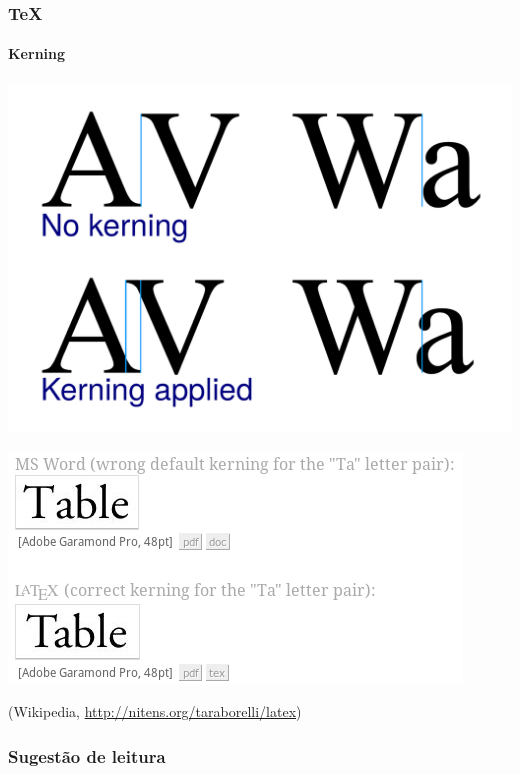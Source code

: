 \begin{frame}
\frametitle{\TeX{}}
\framesubtitle{Kerning}
\includegraphics[width=0.3\linewidth]{figures/kerning.pdf}

\vspace{2ex}
\includegraphics[width=0.4\linewidth]{figures/table_kerning.png}

\footnotesize{(Wikipedia, \url{http://nitens.org/taraborelli/latex})}
\end{frame}


\begin{frame}
\frametitle{Sugestão de leitura}

\vspace{2ex}

\vspace{2ex}

\vspace{2ex}

\vspace{2ex}


\end{frame}
